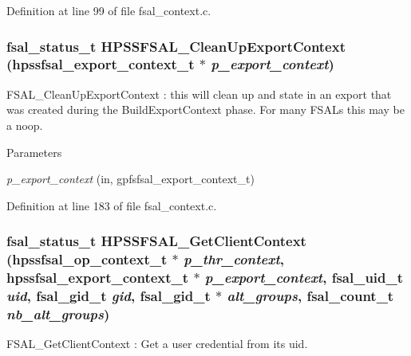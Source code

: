 Definition at line 99 of file fsal\_\-context.c.
\subsubsection[{HPSSFSAL\_\-CleanUpExportContext}]{\setlength{\rightskip}{0pt plus 5cm}fsal\_\-status\_\-t HPSSFSAL\_\-CleanUpExportContext (hpssfsal\_\-export\_\-context\_\-t $\ast$ {\em p\_\-export\_\-context})}\label{group__FSALCredFunctions_ga78fe26f3525f16569a6bfe23cbb78f85}
FSAL\_\-CleanUpExportContext : this will clean up and state in an export that was created during the BuildExportContext phase. For many FSALs this may be a noop.


\begin{DoxyParams}{Parameters}
\item[{\em p\_\-export\_\-context}](in, gpfsfsal\_\-export\_\-context\_\-t) \end{DoxyParams}


Definition at line 183 of file fsal\_\-context.c.
\subsubsection[{HPSSFSAL\_\-GetClientContext}]{\setlength{\rightskip}{0pt plus 5cm}fsal\_\-status\_\-t HPSSFSAL\_\-GetClientContext (hpssfsal\_\-op\_\-context\_\-t $\ast$ {\em p\_\-thr\_\-context}, \/  hpssfsal\_\-export\_\-context\_\-t $\ast$ {\em p\_\-export\_\-context}, \/  fsal\_\-uid\_\-t {\em uid}, \/  fsal\_\-gid\_\-t {\em gid}, \/  fsal\_\-gid\_\-t $\ast$ {\em alt\_\-groups}, \/  fsal\_\-count\_\-t {\em nb\_\-alt\_\-groups})}\label{group__FSALCredFunctions_ga047d7895abd8e50251b3c297e1145153}
FSAL\_\-GetClientContext : Get a user credential from its uid.


